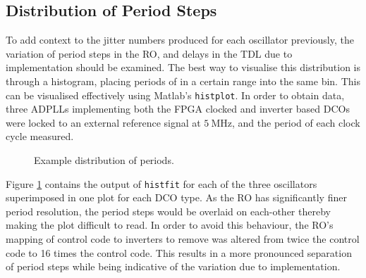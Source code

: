 \subsection{Distribution of Period Steps}
To add context to the jitter numbers produced for each oscillator previously, the variation of period steps in the \ac{RO}, and delays in the \ac{TDL} due to implementation should be examined. The best way to visualise this distribution is through a histogram, placing periods of in a certain range into the same bin. This can be visualised effectively using Matlab's \texttt{histplot}. In order to obtain data, three \acp{ADPLL} implementing both the \ac{FPGA} clocked and inverter based \acp{DCO} were locked to an external reference signal at $5~\si{\mega\hertz}$, and the period of each clock cycle measured.
\begin{figure}[h]%
    \centering
    \caption[Example distribution of periods]{Example distribution of periods.}    
    \label{fig:dists}
\end{figure}
Figure \ref{fig:dists} contains the output of \texttt{histfit} for each of the three oscillators superimposed in one plot for each \ac{DCO} type. As the \ac{RO} has significantly finer period resolution, the period steps would be overlaid on each-other thereby making the plot difficult to read. In order to avoid this behaviour, the \ac{RO}'s mapping of control code to inverters to remove was altered from twice the control code to 16 times the control code. This results in a more pronounced separation of period steps while being indicative of the variation due to implementation.

